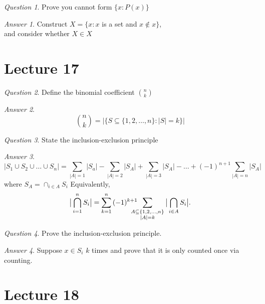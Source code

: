 \documentclass[]{article}
\theoremstyle{remark}
\theoremstyle{qnstyle}
\newtheorem{question}{Question}
\theoremstyle{answerstyle}
\newtheorem*{answer}{Answer}
\begin{document}
\begin{question}
    Prove you cannot form $\{ x: P(x) \}$
\end{question}
\begin{answer}
    Construct $X = \{x: x$ is a set and $x \not \in x \}$,\\
    and consider whether $X \in X$
\end{answer}





\section* {Lecture 17}

\begin{question}
    Define the binomial coefficient $n \choose k$
\end{question}
\begin{answer}
    $${n \choose k} = \big \vert \{ S \subseteq \{1, 2, \ldots, n\}: |S| = k \}|$$
\end{answer}

\begin{question}
    State the inclusion-exclusion principle
\end{question}
\begin{answer}
    $$|S_1 \cup S_2 \cup \ldots \cup S_n| = \sum_{|A|=1}|S_a| 
        - \sum_{|A|=2}|S_A| + \sum_{|A|=3}|S_A| - \ldots
            + (-1)^{n+1}\sum_{|A|=n}|S_A|$$
where $S_A = \cap_{i\in A} S_i$
Equivalently,
    $$\big \vert \bigcap_{i = 1}^n S_i \big \vert = 
    \sum_{k=1}^n{(-1)^{k+1}} \mkern-20mu \sum_{\substack{A \subseteq \{1, 2, \ldots, n \} \\ |A| = k}}
        \big \vert \bigcap_{i \in A} S_i \big \vert.$$
\end{answer}

\begin{question}
    Prove the inclusion-exclusion principle.
\end{question}
\begin{answer}
    Suppose $x \in S_i$ $k$ times and prove that it is only counted once via counting.
\end{answer}





\section* {Lecture 18}
\end{document}
